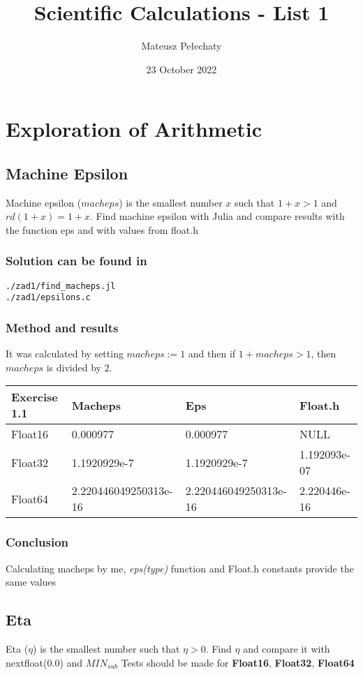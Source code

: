 \documentclass[12pt]{article}
\title{Scientific Calculations - List 1}
\author{Mateusz Pełechaty}
\date{23 October 2022}%
\begin{document}
\maketitle

\section{Exploration of Arithmetic}
\subsection{Machine Epsilon}
Machine epsilon ($macheps$) is the smallest number $x$ such that $1+x > 1$ and $rd(1+x) = 1+x$. \newline
Find machine epsilon with Julia and compare results with the function eps and with values from float.h
\subsubsection*{Solution can be found in}
\begin{verbatim}
./zad1/find_macheps.jl
./zad1/epsilons.c
\end{verbatim}
\subsubsection*{Method and results}
It was calculated by setting $macheps := 1$ and then if $1+macheps > 1$, then $macheps$ is divided by $2$.
\begin{table}[!ht]
    \centering
    \begin{tabular}{|l|l|l|l|}
    \hline
        Exercise 1.1 & Macheps & Eps & Float.h \\ \hline
        Float16 & 0.000977 & 0.000977 & NULL \\ \hline
        Float32 & 1.1920929e-7 & 1.1920929e-7 & 1.192093e-07 \\ \hline
        Float64 & 2.220446049250313e-16 & 2.220446049250313e-16 & 2.220446e-16 \\ \hline
    \end{tabular}
\end{table}
\subsubsection*{Conclusion}
Calculating macheps by me, \emph{eps(type)} function and Float.h constants provide the same values
\subsection{Eta}
Eta ($\eta$) is the smallest number such that $\eta > 0$. \newline
Find $\eta$ and compare it with nextfloat(0.0) and $MIN_{sub}$ \newline
Tests should be made for \textbf{Float16}, \textbf{Float32}, \textbf{Float64}
\end{document}
